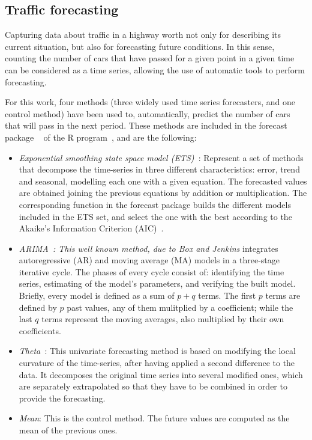 \subsection{Traffic forecasting}
\label{sub:ts_forecasting}
Capturing data about traffic in a highway worth not only for describing its current situation, but also for forecasting future conditions. In this sense, counting the number of cars that have passed for a given point in a given time can be considered as a time series, allowing the use of automatic tools to perform forecasting.

For this work, four methods (three widely used time series forecasters, and one control method) have been used to, automatically, predict the number of cars that will pass in the next period. These methods are included in the forecast package ~\cite{Hyndman08automatictime} of the R program~\cite{R:Bloomfield:2014}, and are the following:

\begin{itemize}
\item {\em Exponential smoothing state space model (ETS)~\cite{ETS:2008}}: Represent a set of methods that decompose the time-series in three different characteristics: error, trend and seasonal, modelling each one with a given equation. The forecasted values are obtained joining the previous equations by addition or multiplication. The corresponding function in the forecast package builds the different models included in the ETS set, and select the one with the best according to the Akaike's Information Criterion (AIC)~\cite{Akaike1973}.
\item {\em ARIMA~\cite{BoxJenk}: This well known method, due to Box and Jenkins } integrates autoregressive (AR) and moving average (MA) models in a three-stage iterative cycle. The phases of every cycle consist of: identifying the time series, estimating of the model's parameters, and verifying the built model. Briefly, every model is defined as a sum of $p+q$ terms. The first $p$  terms are defined by $p$ past values, any of them mulitplied by a coefficient; while the last $q$ terms represent the moving averages, also multiplied by their own coefficients.
\item {\em Theta~\cite{Assima2000}}: This univariate forecasting method is based on modifying the local curvature of the time-series, after having applied a second difference to the data. It decomposes the original time series into several modified ones, which are separately extrapolated so that they have to be combined in order to provide the forecasting.
\item {\em Mean}: This is the control method. The future values are computed as the mean of the previous ones.
\end{itemize}

